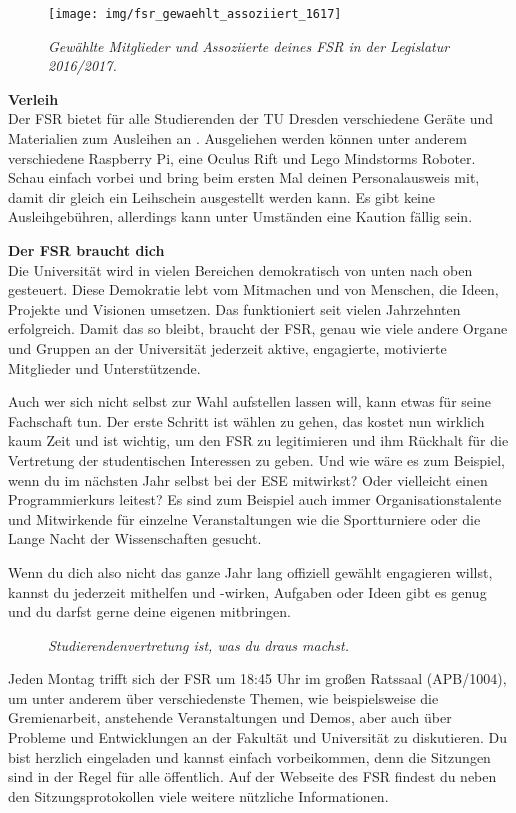 \begin{figure}[h!]
\centering
\texttt{[image: img/fsr\_gewaehlt\_assoziiert\_1617]}
\caption*{\small \textit{Gewählte Mitglieder und Assoziierte deines FSR in der Legislatur 2016/2017.}}
\end{figure}

\textbf{Verleih} \\
Der FSR bietet für alle Studierenden der TU Dresden verschiedene Geräte und Materialien zum Ausleihen an . 
Ausgeliehen werden können unter anderem verschiedene Raspberry Pi, eine Oculus Rift und Lego Mindstorms Roboter.
Schau einfach vorbei und bring beim ersten Mal deinen Personalausweis mit, damit dir gleich ein Leihschein ausgestellt werden kann. 
Es gibt keine Ausleihgebühren, allerdings kann unter Umständen eine Kaution fällig sein.

\textbf{Der FSR braucht dich} \\
Die Universität wird in vielen Bereichen demokratisch von unten nach oben gesteuert. Diese Demokratie lebt vom Mitmachen und von Menschen, die Ideen, Projekte und Visionen umsetzen.
Das funktioniert seit vielen Jahrzehnten erfolgreich.
Damit das so bleibt, braucht der FSR, genau wie viele andere Organe und Gruppen an der Universität jederzeit aktive, engagierte, motivierte Mitglieder und Unterstützende.

Auch wer sich nicht selbst zur Wahl aufstellen lassen will, kann etwas für seine Fachschaft tun.
Der erste Schritt ist wählen zu gehen, das kostet nun wirklich kaum Zeit und ist wichtig, um den FSR zu legitimieren und ihm Rückhalt für die Vertretung der studentischen Interessen zu geben.
Und wie wäre es zum Beispiel, wenn du im nächsten Jahr selbst bei der ESE mitwirkst? Oder vielleicht einen Programmierkurs leitest?
Es sind zum Beispiel auch immer Organisationstalente und Mitwirkende für einzelne Veranstaltungen wie die Sportturniere oder die Lange Nacht der Wissenschaften gesucht.

Wenn du dich also nicht das ganze Jahr lang offiziell gewählt engagieren willst, kannst du jederzeit mithelfen und -wirken, Aufgaben oder Ideen gibt es genug und du darfst gerne deine eigenen mitbringen. 

\begin{figure}[h!]
\centering
\textit{Studierendenvertretung ist, was du draus machst.}
\end{figure}

Jeden Montag trifft sich der FSR um 18:45 Uhr im großen Ratssaal (APB/1004), um unter anderem über verschiedenste Themen, wie beispielsweise die Gremienarbeit, anstehende Veranstaltungen und Demos, aber auch über Probleme und Entwicklungen an der Fakultät und Universität zu diskutieren.
Du bist herzlich eingeladen und kannst einfach vorbeikommen, denn die Sitzungen sind in der Regel für alle öffentlich. Auf der Webseite des FSR  findest du neben den Sitzungsprotokollen  viele weitere nützliche Informationen.

